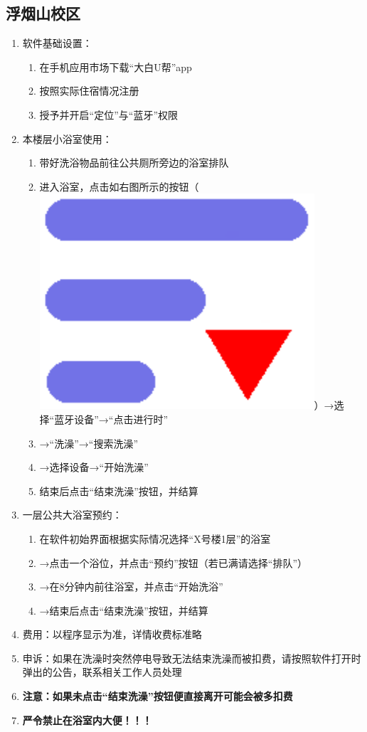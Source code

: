\subsection[浮烟山校区]{浮烟山校区}
\label{shower_software_f}
\begin{enumerate}
      \item 软件基础设置：
            \begin{enumerate}
                  \item 在手机应用市场下载“大白U帮”app
                  \item 按照实际住宿情况注册
                  \item 授予并开启“定位”与“蓝牙”权限
            \end{enumerate}
      \item 本楼层小浴室使用：
            \begin{enumerate}
                  \item 带好洗浴物品前往公共厕所旁边的浴室排队
                  \item 进入浴室，点击如右图所示的按钮（\mbox{\includegraphics[height=2.4ex]{bath.pdf}}）→选择“蓝牙设备”→“点击进行时”
                  \item →“洗澡”→“搜索洗澡”\footnotemark
                  \item →选择设备\footnotemark →“开始洗澡”
                  \item 结束后点击“结束洗澡”按钮，并结算
            \end{enumerate}
      \item 一层公共大浴室预约：
            \begin{enumerate}
                  \item 在软件初始界面根据实际情况选择“X号楼1层”的浴室
                  \item →点击一个浴位，并点击“预约”按钮（若已满请选择“排队”）
                  \item →在8分钟内前往浴室，并点击“开始洗浴”
                  \item →结束后点击“结束洗澡”按钮，并结算
            \end{enumerate}
      \item 费用：以程序显示为准，详情收费标准略
      \item 申诉：如果在洗澡时突然停电导致无法结束洗澡而被扣费，请按照软件打开时弹出的公告，联系相关工作人员处理
      \item \textbf{注意：如果未点击“结束洗澡”按钮便直接离开可能会被多扣费}
      \item \textbf{严令禁止在浴室内大便！！！}
\end{enumerate}
